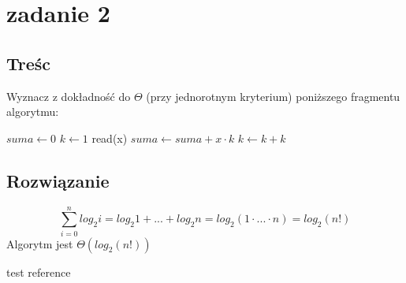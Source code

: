 \documentclass[svgnames]{report}
\begin{document}

\section{zadanie 2}
\subsection{Treśc}
Wyznacz z dokładność do $\Theta$ (przy jednorotnym kryterium) poniższego fragmentu algorytmu:
\begin{algorithmic}
\STATE $suma \leftarrow 0$
	\STATE $k \leftarrow 1$
		\STATE read(x)
		\STATE $suma \leftarrow suma + x \cdot k$
		\STATE $k \leftarrow k + k$
	\ENDWHILE
\ENDFOR
\end{algorithmic}
\subsection{Rozwiązanie}

\begin{equation*}
	\sum\limits_{i=0}^{n} log_2 i = log_2 1 + ... + log_2 n = log_2(1 \cdot ... \cdot n) = log_2(n!)
\end{equation*}
Algorytm jest $\Theta(log_2(n!))$



\begin{thebibliography}{99}
 test reference
\end{thebibliography}
\end{document}
